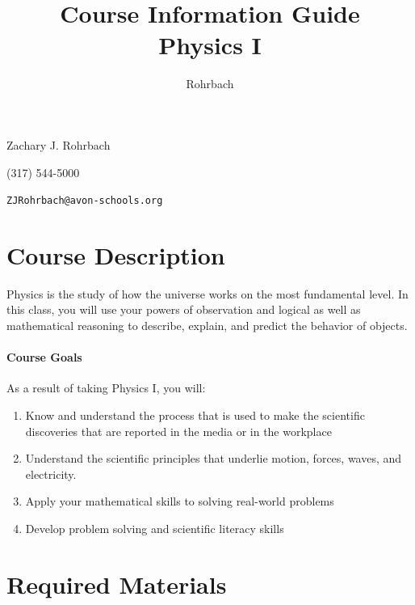 \documentclass[10pt]{exam}
\title{Course Information Guide \\ Physics I}
\author{Rohrbach}
\newcommand{\phonenumber}{(317) 544-5000}
\begin{document}
\maketitle

\noindent Zachary J. Rohrbach

\noindent \phonenumber

\noindent \texttt{ZJRohrbach@avon-schools.org}

\vspace{-0.5em}


\section*{Course Description}

Physics is the study of how the universe works on the most fundamental level.  In this 
class, you will use your powers of observation and logical as well as mathematical 
reasoning to describe, explain, and predict the behavior of objects.

\paragraph{Course Goals} 
As a result of taking Physics I, you will:

\begin{enumerate}
	\item Know and understand the process that is used to make the scientific discoveries that 
				are reported in the media or in the workplace
	\item Understand the scientific principles that underlie motion, forces, waves, and electricity.
	\item Apply your mathematical skills to solving real-world problems
	\item Develop problem solving and scientific literacy skills
\end{enumerate}

\section*{Required Materials}
\end{document}
